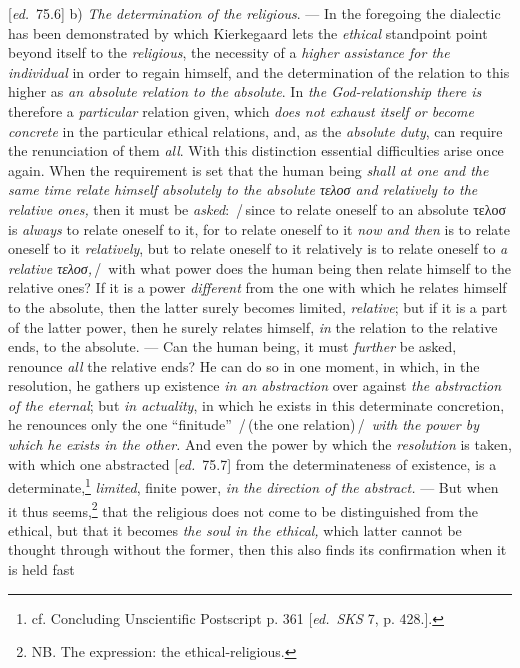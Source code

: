 \documentclass[12pt,a4paper,openany]{book}
\newcommand{\kpage}[1]{\marginnote{\footnotesize\textit{[#1]}}}
\newcommand{\ed}[1]{{\small[\textit{ed.}\ #1]}}
\newcommand{\ins}[1]{\,/\,#1\,/\,}
\begin{document}
\ed{75.6} b) \emph{The determination of the religious}. --- In the foregoing the dialectic has been demonstrated
by which Kierkegaard lets the \emph{ethical} standpoint
point beyond itself to the \emph{religious}, the necessity of a \emph{higher
assistance for the individual} in order to regain himself, and the determination of the relation
to this higher as \emph{an absolute relation to the absolute}. In \emph{the God-relationship
there is} therefore a \emph{particular} relation given, which \emph{does not exhaust itself or become concrete}
\kpage{172}in the particular ethical relations, and, as the \emph{absolute duty}, can require
the renunciation of them \emph{all}. With this distinction essential difficulties
arise once again. When the requirement is set that the human being
\emph{shall at one and the same time relate himself absolutely to the absolute τελοσ and relatively to the relative ones,}
then it must be \emph{asked}: \ins{since to relate oneself to an absolute
τελοσ is \emph{always} to relate oneself to it, for to relate oneself to it \emph{now and then} is
to relate oneself to it \emph{relatively}, but to relate oneself to it relatively is to
relate oneself to \emph{a relative τελοσ,}} with what power does the human being
then relate himself to the relative ones? If it is a power \emph{different} from the one
with which he relates himself to the absolute, then the latter surely becomes
limited, \emph{relative}; but if it is a part of the latter power, then he surely relates
himself, \emph{in} the relation to the relative ends, to the absolute.
--- Can the human being, it must \emph{further} be asked, renounce \emph{all} the relative
ends? He can do so in one moment, in which, in the resolution, he
gathers up existence \emph{in an abstraction} over against \emph{the abstraction of the eternal};
but \emph{in actuality}, in which he exists in this determinate
concretion, he renounces only the one ``finitude'' \ins{(the one relation)}
\emph{with the power by which he exists in the other.} And even the
power by which the \emph{resolution} is taken, with which one abstracted
\ed{75.7} from the determinateness of existence, is a determinate,\footnote[128]{cf. Concluding Unscientific Postscript p. 361 \ed{\emph{SKS} 7, p. 428.}.} \emph{limited}, finite
power, \emph{in the direction of the abstract.} --- But when it thus seems,\footnote[129]{NB. The expression: the ethical-religious.}
that the religious does not come to be distinguished from the ethical, but that
it becomes \emph{the soul in the ethical,} which latter cannot be thought through
without the former, then this also finds its confirmation when it is held fast
\end{document}
